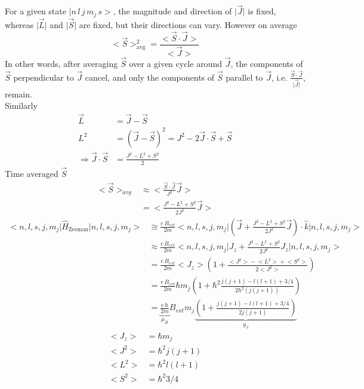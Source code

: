\documentclass[12pt,fancychapters]{report}
\numberwithin{equation}{section}
\begin{document}
For a given state $\big|n\,l\,j\,m_j\,s\big>$, the magnitude and direction of $\big|\vec{J}\big|$
is fixed, whereas $\big|\vec{L}\big|$ and $\big|\vec{S}\big|$ are fixed, but their directions 
can vary. However on average
\[
  \big<\vec{S}\big>^2_\text{avg} = \frac{\big<\vec{S}\cdot \vec{J}\big>}{\big<\vec{J}\big>}
\]
In other words, after averaging $\vec{S}$ over a given cycle around $\vec{J}$, the components of 
$\vec{S}$ perpendicular to $\vec{J}$ cancel, and only the components of $\vec{S}$ parallel to 
$\vec{J}$, i.e. $\frac{\vec{S}\cdot\vec{J}}{\big|\vec{J}\big|}$, remain.\\
Similarly 
\begin{align*}
  \vec{L} &= \vec{J}-\vec{S}\\
  L^2 &= \left(\vec{J}-\vec{S}\right)^2 = J^2 - 2\vec{J}\cdot\vec{S} + \vec{S}\\
  \Rightarrow \vec{J}\cdot\vec{S} &= \frac{J^2-L^2+S^2}{2}
\end{align*}
Time averaged $\vec{S}$
\begin{align*}
  \big<\vec{S}\big>_{avg} &\approx \Bigg<\frac{\vec{S}\cdot\vec{J}}{J^2}\vec{J}\Bigg>\\
                          &= \Bigg<\frac{J^2 - L^2 + S^2}{2J^2}\vec{J}\Bigg>
\end{align*}
\begin{align*}
  \big<n, l, s, j, m_j\big|\hat{H}_\text{Zeeman}\big|n, l, s, j, m_j\big> 
  &\cong  \frac{e\,B_{ext}}{2m}\Big<n, l, s, j, m_j\Big|\left(\vec{J}+\frac{J^2-L^2+S^2}{2J^2}
  \vec{J}\right)\cdot\hat{k}\Big|n, l, s, j, m_j\Big>\\
  & \approx \frac{e\,B_{ext}}{2m}\Big<n, l, s, j, m_j\Big|J_z+\frac{J^2-L^2+S^2}{2J^2}
  J_z\Big|n, l, s, j, m_j\Big>\\
  &=\frac{e\,B_{ext}}{2m}\big<J_z\big>\left(1 +\frac{\big<J^2\big>-\big<L^2\big>+
  \big<S^2\big>}{2\big<J^2\big>} \right)\\
  & = \frac{e\,B_{ext}}{2m}\hbar m_j\left(1 +\hbar^2\frac{j(j+1) -l(l+1)+3/4 }{2\hbar^2
  (j(j+1))}\right)\\
  & = \underbrace{\frac{e\,\hbar}{2m}}_{\mu_B}B_{ext}m_j\underbrace{\left(1 + \frac{j(j+1)
  -l(l+1)+3/4}{2j(j+1)}\right)}_{g_J}
\end{align*}
\begin{align*}
  \big<J_z\big> &= \hbar m_j\\
  \big<J^2\big> &= \hbar^2 j(j+1)\\
  \big<L^2\big> &= \hbar^2 l(l+1)\\
  \big<S^2\big> &= \hbar^2 3/4
\end{align*}
\end{document}
